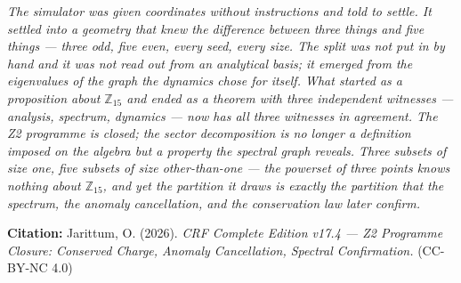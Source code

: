 \documentclass[12pt, a4paper]{article}
\begin{document}
\bigskip
\begin{center}
\textit{The simulator was given coordinates without instructions and
told to settle. It settled into a geometry that knew the difference
between three things and five things --- three odd, five even, every
seed, every size. The split was not put in by hand and it was not
read out from an analytical basis; it emerged from the eigenvalues
of the graph the dynamics chose for itself. What started as a
proposition about $\mathbb{Z}_{15}$ and ended as a theorem with
three independent witnesses --- analysis, spectrum, dynamics --- now
has all three witnesses in agreement. The Z2 programme is closed;
the sector decomposition is no longer a definition imposed on the
algebra but a property the spectral graph reveals. Three subsets of
size one, five subsets of size other-than-one --- the powerset of
three points knows nothing about $\mathbb{Z}_{15}$, and yet the
partition it draws is exactly the partition that the spectrum, the
anomaly cancellation, and the conservation law later confirm.}
\end{center}

\bigskip
\begin{center}
\textbf{Citation:} Jarittum, O. (2026).
\textit{CRF Complete Edition v17.4 --- Z2 Programme Closure:
Conserved Charge, Anomaly Cancellation, Spectral Confirmation.}
(CC-BY-NC 4.0)
\end{center}

\bigskip

\end{document}
